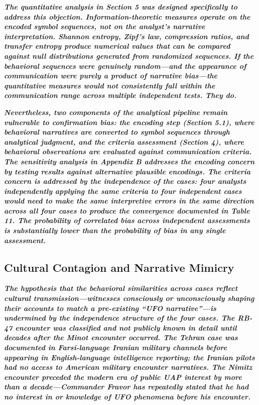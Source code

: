 \documentclass[11pt,letterpaper]{article}
\begin{document}
\textbf{\textit{The quantitative analysis in Section 5 was designed specifically to address this objection. Information-theoretic measures operate on the encoded symbol sequences, not on the analyst's narrative interpretation. Shannon entropy, Zipf's law, compression ratios, and transfer entropy produce numerical values that can be compared against null distributions generated from randomized sequences. If the behavioral sequences were genuinely random---and the appearance of communication were purely a product of narrative bias---the quantitative measures would not consistently fall within the communication range across multiple independent tests. They do.}}


\textbf{\textit{Nevertheless, two components of the analytical pipeline remain vulnerable to confirmation bias: the encoding step (Section 5.1), where behavioral narratives are converted to symbol sequences through analytical judgment, and the criteria assessment (Section 4), where behavioral observations are evaluated against communication criteria. The sensitivity analysis in Appendix B addresses the encoding concern by testing results against alternative plausible encodings. The criteria concern is addressed by the independence of the cases: four analysts independently applying the same criteria to four independent cases would need to make the same interpretive errors in the same direction across all four cases to produce the convergence documented in Table 11. The probability of correlated bias across independent assessments is substantially lower than the probability of bias in any single assessment.}}


\subsection{Cultural Contagion and Narrative Mimicry}

\textbf{\textit{The hypothesis that the behavioral similarities across cases reflect cultural transmission---witnesses consciously or unconsciously shaping their accounts to match a pre-existing ``UFO narrative''---is undermined by the independence structure of the four cases. The RB-47 encounter was classified and not publicly known in detail until decades after the Minot encounter occurred. The Tehran case was documented in Farsi-language Iranian military channels before appearing in English-language intelligence reporting; the Iranian pilots had no access to American military encounter narratives. The Nimitz encounter preceded the modern era of public UAP interest by more than a decade---Commander Fravor has repeatedly stated that he had no interest in or knowledge of UFO phenomena before his encounter.}}
\end{document}
